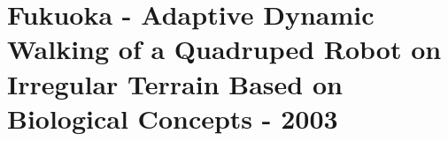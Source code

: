 \section{Fukuoka - Adaptive Dynamic Walking of a Quadruped Robot on Irregular Terrain Based on Biological Concepts - 2003}